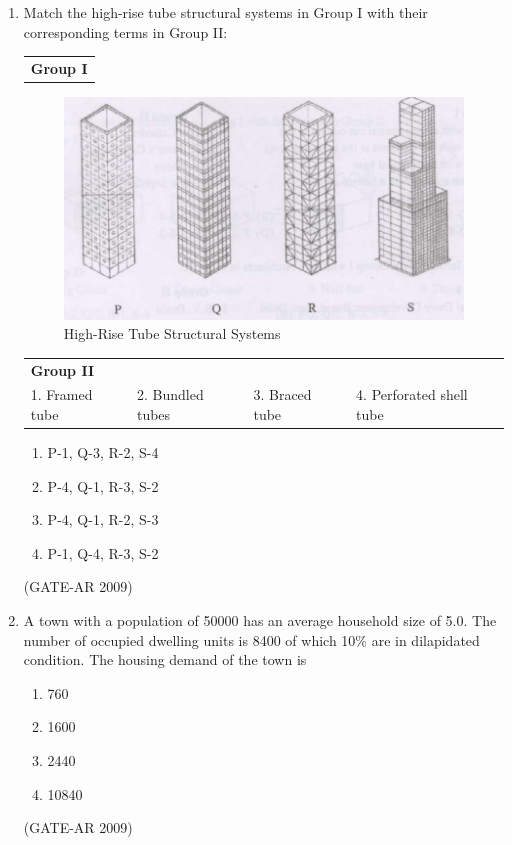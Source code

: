 \documentclass[a4paper,10pt]{article}
\begin{document}
\begin{enumerate}
    \item Match the high-rise tube structural systems in Group I with their corresponding terms in Group II:  \\
    \begin{tabular}{ l }
	\textbf{Group I} \\
	\end{tabular}
	\begin{figure}[h!]
        \centering
        \includegraphics[width=0.5\linewidth]{figs/02.jpg}
	\caption{High-Rise Tube Structural Systems}
    \label{fig:Img02}
	\end{figure}
    \begin{tabular}{ l l l l }
	\textbf{Group II} & & & \\
	1. Framed tube & 2. Bundled tubes & 3. Braced tube & 4. Perforated shell tube \\
	\end{tabular}
	\begin{multicols}{2}
	\begin{enumerate}
        \item P-1, Q-3, R-2, S-4
        \item P-4, Q-1, R-3, S-2
        \item P-4, Q-1, R-2, S-3
        \item P-1, Q-4, R-3, S-2
    \end{enumerate}
	\end{multicols}
    \hfill (GATE-AR 2009)

    \item A town with a population of 50000 has an average household size of 5.0. The number of occupied dwelling units is 8400 of which 10\% are in dilapidated condition. The housing demand of the town is 
    \begin{multicols}{4}
	\begin{enumerate}
        \item 760
        \item 1600
        \item 2440
        \item 10840
    \end{enumerate}
	\end{multicols}
    \hfill (GATE-AR 2009)


\end{enumerate}
\end{document}
